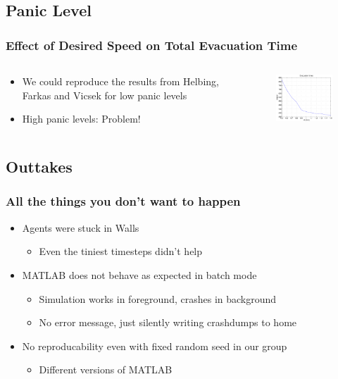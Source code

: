 \documentclass{beamer}
\begin{document}
\subsection{Panic Level}
\begin{frame}
	\frametitle{Effect of Desired Speed on Total Evacuation Time}
	\begin{columns}
		\begin{column}{5cm}
			\begin{itemize}
				\item We could reproduce the results from Helbing, Farkas and Vicsek for low panic levels
				\item High panic levels: Problem!
			\end{itemize}
		\end{column}
		\begin{column}{5cm}
			\begin{figure}
				\includegraphics[width=5cm]{images/evactimes1to11.eps}
			\end{figure}
		\end{column}
	\end{columns}
\end{frame}

\subsection{Outtakes}

\begin{frame}
	\frametitle{All the things you don't want to happen}
	\begin{itemize}
		\item Agents were stuck in Walls
		\begin{itemize}
			\item Even the tiniest timesteps didn't help
		\end{itemize}
		\item MATLAB does not behave as expected in batch mode
		\begin{itemize}
			\item Simulation works in foreground, crashes in background
			\item No error message, just silently writing crashdumps to home
		\end{itemize}
		\item No reproducability even with fixed random seed in our group
		\begin{itemize}
			\item Different versions of MATLAB
		\end{itemize}
	\end{itemize}
\end{frame}
\end{document}
